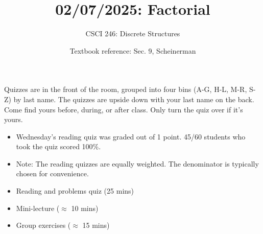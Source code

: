 \documentclass[10pt]{beamer}
\begin{document}






\title{02/07/2025: Factorial}
\author{CSCI 246: Discrete Structures}
\date{Textbook reference: Sec. 9, Scheinerman}

\begin{frame}
    \titlepage 
\end{frame}


\begin{frame}
\footnotesize 

\begin{mygreenbox}[title=Graded Quiz Pickup]
Quizzes are in the front of the room, grouped into four bins (A-G, H-L, M-R, S-Z) by last name. The quizzes are upside down with your last name on the back. Come find yours before, during, or after class.  Only turn the quiz over if it's yours.
\end{mygreenbox} 
\vfill 

\begin{myredbox}[title=Announcements]

\begin{itemize}
\item Wednesday's reading quiz was graded out of 1 point.  45/60 students who took the quiz scored 100\%.
\item Note: The reading quizzes are equally weighted.  The denominator is typically chosen for convenience.  
\end{itemize}

\end{myredbox}

\vfill 


\begin{myyellowbox}[title=Today's Agenda]
\begin{itemize}
	\item Reading and problems quiz  (25 mins)
	\item Mini-lecture ($\approx$ 10 mins)
	\item Group exercises ($\approx$ 15 mins)
\end{itemize}

\end{myyellowbox}
\vfill 

\end{frame}
\end{document}
